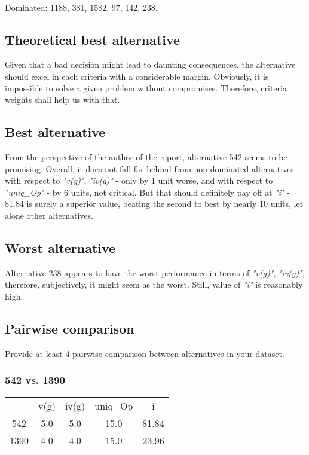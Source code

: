 \documentclass{article}
\begin{document}
\

\noindent Dominated: 1188, 381, 1582, 97, 142, 238.



\subsection{Theoretical best alternative}
Given that a bad decision might lead to daunting consequences, the alternative should excel in each criteria with a considerable margin. Obviously, it is impossible to solve a given problem without compromises. Therefore, criteria weights shall help us with that.

\subsection{Best alternative}

From the perspective of the author of the report, alternative 542 seems to be promising.
Overall, it does not fall far behind from non-dominated alternatives with respect to \textit{"v(g)"}, \textit{"iv(g)"} - only by 1 unit worse, and with respect to \textit{"uniq\_Op"} - by 6 units, not critical. But that should definitely pay off at \textit{"i"} - 81.84 is surely a superior value, beating the second to best by nearly 10 units, let alone other alternatives.

\subsection{Worst alternative}

Alternative 238 appears to have the worst performance in terms of \textit{"v(g)"}, \textit{"iv(g)"}, therefore, subjectively, it might seem as the worst. Still, value of \textit{"i"} is reasonably high.

\subsection{Pairwise comparison}
Provide at least 4 pairwise comparison between alternatives in your dataset.

\subsubsection{542 vs. 1390}

\begin{center}
\begin{tabular}{ |c|c|c|c|c| }
    & v(g) & iv(g) & uniq\_Op & i \\
    542 & 5.0 & 5.0 & 15.0 & 81.84 \\
    1390 & 4.0 & 4.0 & 15.0 & 23.96 \\
\end{tabular}
\end{center}
\end{document}
